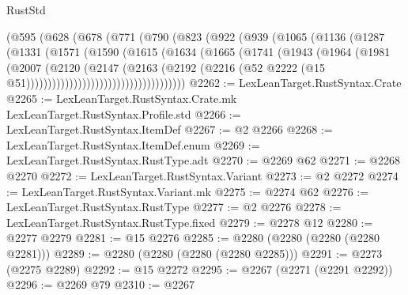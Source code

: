 \begin{lexlean}{RustStd}
\begin{coremodule}
                    (@595
                      (@628
                        (@678
                          (@771
                            (@790
                              (@823
                                (@922
                                  (@939
                                    (@1065
                                      (@1136
                                        (@1287
                                          (@1331
                                            (@1571
                                              (@1590
                                                (@1615
                                                  (@1634
                                                    (@1665
                                                      (@1741
                                                        (@1943
                                                          (@1964
                                                            (@1981
                                                              (@2007
                                                                (@2120
                                                                  (@2147
                                                                    (@2163
                                                                      (@2192
                                                                        (@2216
                                                                          (@52
                                                                            @2222
                                                                            (@15
                                                                              @51)))))))))))))))))))))))))))))))))))))
@2262 := LexLeanTarget.RustSyntax.Crate
@2265 := LexLeanTarget.RustSyntax.Crate.mk LexLeanTarget.RustSyntax.Profile.std
@2266 := LexLeanTarget.RustSyntax.ItemDef
@2267 := @2 @2266
@2268 := LexLeanTarget.RustSyntax.ItemDef.enum
@2269 := LexLeanTarget.RustSyntax.RustType.adt
@2270 := @2269 @62
@2271 := @2268 @2270
@2272 := LexLeanTarget.RustSyntax.Variant
@2273 := @2 @2272
@2274 := LexLeanTarget.RustSyntax.Variant.mk
@2275 := @2274 @62
@2276 := LexLeanTarget.RustSyntax.RustType
@2277 := @2 @2276
@2278 := LexLeanTarget.RustSyntax.RustType.fixed
@2279 := @2278 @12
@2280 := @2277 @2279
@2281 := @15 @2276
@2285 := @2280 (@2280 (@2280 (@2280 @2281)))
@2289 := @2280 (@2280 (@2280 (@2280 @2285)))
@2291 := @2273 (@2275 @2289)
@2292 := @15 @2272
@2295 := @2267 (@2271 (@2291 @2292))
@2296 := @2269 @79
@2310 := @2267

\end{coremodule}
\end{lexlean}
